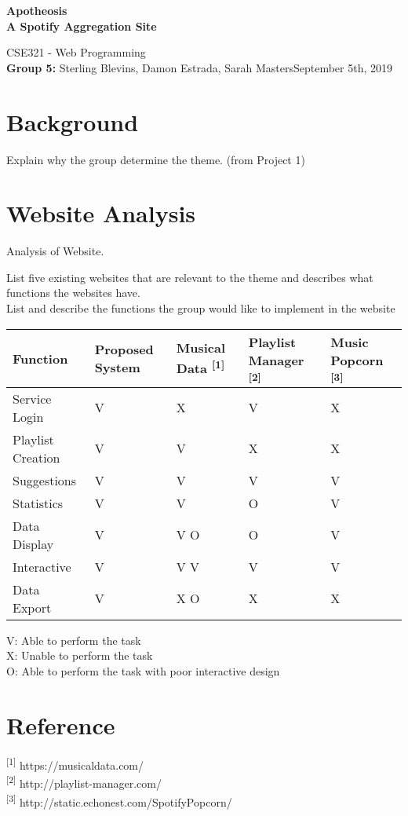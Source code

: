 \documentclass[letter, 11pt]{article}
\begin{document}
\noindent
\begin{center}
\large\textbf{Apotheosis} \\
\textbf{A Spotify Aggregation Site}
\end{center}

\noindent
\normalsize CSE321 - Web Programming\\
\textbf{Group 5:} Sterling Blevins, Damon Estrada, Sarah Masters\hfill September 5th, 2019
 
\section*{Background}
Explain why the group determine the theme. (from Project 1)

\section*{Website Analysis}
Analysis of Website.

\noindent
List five existing websites that are relevant to the theme and describes what functions the websites have. \\

\noindent
List and describe the functions the group would like to implement in the website \\

\begin{tabular}{ |p{3cm}|p{2cm}|p{2cm}|p{2cm}|p{2cm}|  }
 \hline
 Function & Proposed System & Musical Data \textsuperscript{[1]} & Playlist Manager \textsuperscript{[2]} & Music Popcorn \textsuperscript{[3]}\\
 \hline
 Service Login & V & X & V & X\\
 Playlist Creation & V & V & X & X\\
 Suggestions & V & V & V & V\\
 Statistics & V & V & O & V\\
 Data Display & V & V O & O & V\\
 Interactive & V & V V & V & V\\
 Data Export & V & X O & X & X\\
 \hline
\end{tabular}

V: Able to perform the task \\
\indent
X: Unable to perform the task \\
\indent
O: Able to perform the task with poor interactive design


\section*{Reference}
\noindent
{\textsuperscript{[1]} https://musicaldata.com/} \\
{\textsuperscript{[2]} http://playlist-manager.com/} \\
{\textsuperscript{[3]} http://static.echonest.com/SpotifyPopcorn/}
\end{document}
